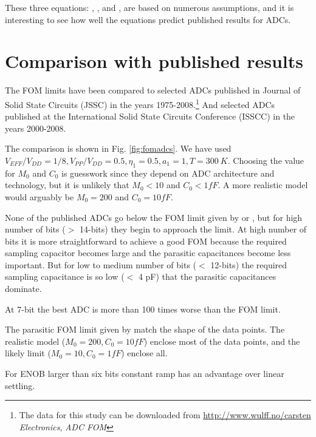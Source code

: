 These three 
equations: , , and , are based on numerous
assumptions, and it is interesting to see how well the equations predict
published results for ADCs.

\section{Comparison with published results}
The FOM limits have been compared to selected ADCs published in Journal of
Solid State Circuits (JSSC) in the 
years 1975-2008.\footnote{The data for this study can be downloaded
  from \url{http://www.wulff.no/carsten} \textit{Electronics},
  \textit{ADC FOM}} And selected ADCs published at the International Solid State 
Circuits Conference (ISSCC) in the years 2000-2008. 

The comparison is
shown in Fig. \ref{fig:fomadcs}. We have used
$V_{EFF}/V_{DD} = 1/8, V_{PP}/V_{DD} = 0.5, \eta_1 = 0.5, a_1 = 1,
T = 300\: K$. Choosing the value for $M_0$ and $C_0$ is guesswork since
they depend on ADC architecture and technology, but it
is unlikely that $M_0 < 10$ and $C_0 < 1fF$. A more realistic model
would arguably be $M_0 = 200$ and $C_0 = 10fF$.  

None of the published
ADCs go below the FOM limit given by  or , but for high number of bits ($>$ 14-bits)
they begin to approach the limit. At high number of bits it is more
straightforward to achieve a good FOM because the required
sampling capacitor becomes large and the parasitic capacitances become
less important. But for low to medium number of bits ($<$ 12-bits) the
required sampling capacitance is so low ($<$ 4 pF)  that the parasitic
capacitances dominate. 

At 7-bit the best ADC is more
than 100 times worse than the FOM limit. 

The parasitic FOM limit given by  match the shape of the
data points. 
The realistic model ($M_0 = 200, C_0 = 10fF$) enclose most of the data
points, and the likely limit ($M_0 = 10, C_0 = 1fF$) enclose all.



For ENOB larger than six bits constant ramp has an advantage over
linear settling.


